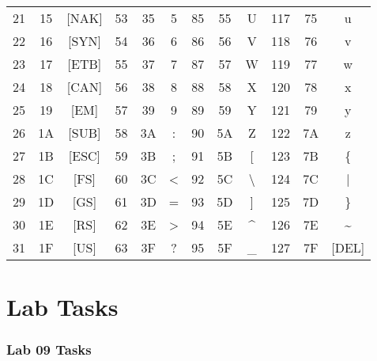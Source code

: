 \documentclass[12pt]{article}
\begin{document}
\begin{table}[H]
{\begin{tabular}{| c | c | c | c | c | c | c | c | c | c | c | c |}
    21 & 15 & [NAK] & 53 & 35 & 5 & 85 & 55 & U & 117 & 75 & u \\
    22 & 16 & [SYN] & 54 & 36 & 6 & 86 & 56 & V & 118 & 76 & v \\
    23 & 17 & [ETB] & 55 & 37 & 7 & 87 & 57 & W & 119 & 77 & w \\
    24 & 18 & [CAN] & 56 & 38 & 8 & 88 & 58 & X & 120 & 78 & x \\
    25 & 19 & [EM] & 57 & 39 & 9 & 89 & 59 & Y & 121 & 79 & y \\
    26 & 1A & [SUB] & 58 & 3A & : & 90 & 5A & Z & 122 & 7A & z \\
    27 & 1B & [ESC] & 59 & 3B & ; & 91 & 5B & [ & 123 & 7B & \{ \\
    28 & 1C & [FS] & 60 & 3C & < & 92 & 5C & \textbackslash & 124 & 7C & | \\
    29 & 1D & [GS] & 61 & 3D & = & 93 & 5D & ] & 125 & 7D & \} \\
    30 & 1E & [RS] & 62 & 3E & > & 94 & 5E & \textasciicircum & 126 & 7E & \textasciitilde \\
    31 & 1F & [US] & 63 & 3F & ? & 95 & 5F & \_ & 127 & 7F & [DEL] \\
    \hline
    \end{tabular}
}
\end{table}











\newpage
{}
\part*{\centering Lab Tasks}

\section*{Lab 09 Tasks}
\end{document}
